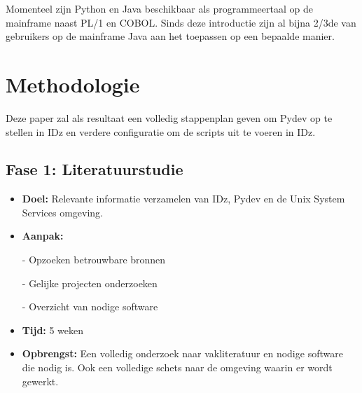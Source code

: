 Momenteel zijn Python en Java beschikbaar als programmeertaal op de mainframe naast PL/1 en COBOL.
Sinds deze introductie zijn al bijna 2/3de van gebruikers op de mainframe Java aan het toepassen op een bepaalde manier. \autocite{Watts2018}




\section{Methodologie}%
\label{sec:methodologie}
Deze paper zal als resultaat een volledig stappenplan geven om Pydev op te stellen in IDz en verdere configuratie om de scripts uit te voeren in IDz.

\subsection{Fase 1: Literatuurstudie}
\begin{itemize}
    \item \textbf{Doel:}
    Relevante informatie verzamelen van IDz, Pydev en de Unix System Services omgeving.
    \item \textbf{Aanpak:}
    \item[-] Opzoeken betrouwbare bronnen
    \item[-] Gelijke projecten onderzoeken
    \item[-] Overzicht van nodige software
    \item \textbf{Tijd:} 5 weken
    \item \textbf{Opbrengst:}
    Een volledig onderzoek naar vakliteratuur en nodige software die nodig is. Ook een volledige schets naar de omgeving waarin er wordt gewerkt.
\end{itemize}


